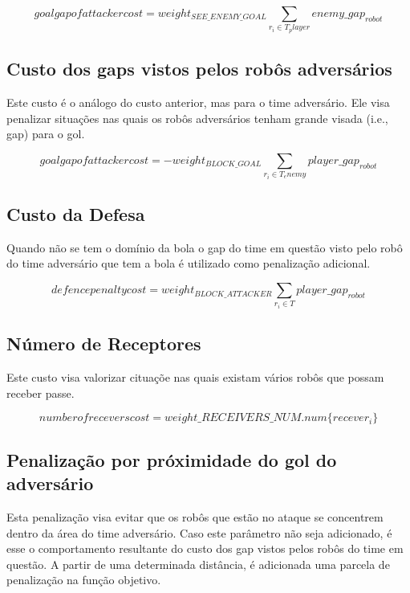 \begin{dmath}
   goal gap of attacker cost = weight_{SEE{\_}ENEMY{\_}GOAL}
    \sum_{r_i \in T_player} enemy{\_}gap_{robot}
\end{dmath}

\subsection{Custo dos gaps vistos pelos robôs adversários}

Este custo é o análogo do custo anterior, mas para o
time adversário. Ele visa penalizar situações nas quais
os robôs adversários tenham grande visada (i.e., gap)
para o gol. 

\begin{dmath}
   goal gap of attacker cost = - weight_{BLOCK{\_}GOAL}
    \sum_{r_i \in T_enemy} player{\_}gap_{robot}
\end{dmath}

\subsection{Custo da Defesa}
Quando não se tem o domínio da bola o gap do time em questão
visto pelo robô do time adversário que tem a bola é utilizado
como penalização adicional.

\begin{dmath}
  defence penalty cost = weight_{BLOCK{\_}ATTACKER}
   \sum_{r_i \in T} player{\_}gap_{robot}
\end{dmath}

\subsection{Número de Receptores}

Este custo visa valorizar cituaçõe nas quais existam
vários robôs que possam receber passe.

\begin{dmath}
  number of recevers cost = weight{\_}RECEIVERS{\_}NUM . 
   num \lbrace recever_i \rbrace
\end{dmath}

\subsection{Penalização por próximidade do gol do adversário}
Esta penalização visa evitar que os robôs que estão no ataque
se concentrem dentro da área do time adversário. Caso este
parâmetro não seja adicionado, é esse o comportamento resultante
do custo dos gap vistos pelos robôs do time em questão. 
A partir de uma determinada distância, é adicionada uma parcela
de penalização na função objetivo.

